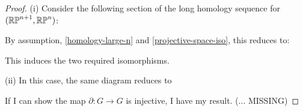 \begin{proof}
(i) Consider the following section of the long homology sequence for $(\mathbb{RP}^{n+1},\mathbb{RP}^{n})$:


By assumption, \ref{homology-large-n} and \ref{projective-space-iso}, this reduces to:


This induces the two required isomorphisms.

(ii) In this case, the same diagram reduces to


If I can show the map $\partial: G\rightarrow G$ is injective, I have my result. (... MISSING)

\end{proof}